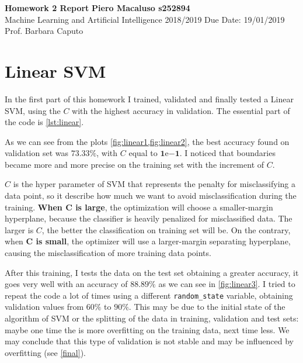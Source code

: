 \documentclass[a4paper, 11pt]{article}
\begin{document}
	\noindent
	\large\textbf{Homework 2 Report} \hfill \textbf{Piero Macaluso s252894} \\
	\normalsize Machine Learning and Artificial Intelligence 2018/2019 \hfill Due Date: 19/01/2019 \\
	Prof. Barbara Caputo  
	
	\section{Linear SVM} \label{linearsvm}
	
	In the first part of this homework I trained, validated and finally tested a Linear SVM, using the $C$ with the highest accuracy in validation. The essential part of the code is \vref{lst:linear}.
	
	
%	
%	
	
	As we can see from the plots \vref{fig:linear1,fig:linear2}, the best accuracy found on validation set was $\boldsymbol{73.33\%}$, with $C$ equal to  $\boldsymbol{1\mathrm{e}{-1}}$. I noticed that boundaries became more and more precise on the training set with the increment of $C$. 
	
	$C$ is the hyper parameter of SVM that represents the penalty for misclassifying a data point, so it describe how much we want to avoid misclassification during the training.
	\textbf{When $\boldsymbol{C}$ is large}, the optimization will choose a smaller-margin hyperplane, because the classifier is heavily penalized for misclassified data.
	The larger is $C$, the better the classification on training set will be. On the contrary, when \textbf{$\boldsymbol{C}$ is small}, the optimizer will use a larger-margin separating hyperplane, causing the misclassification of more training data points.
	
	After this training, I tests the data on the test set obtaining a greater accuracy, it goes very well with an accuracy of $\boldsymbol{88.89\%}$ as we can see in \vref{fig:linear3}.  I tried to repeat the code a lot of times using a different \texttt{random\_state} variable, obtaining validation values from $60\%$ to $90\%$. This may be due to the initial state of the algorithm of SVM or the splitting of the data in training, validation and test sets: maybe one time the is more overfitting on the training data, next time less. We may conclude that this type of validation is not stable and may be influenced by overfitting (see \vref{final}).
\end{document}
